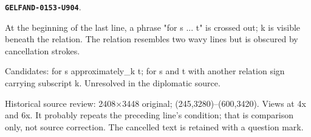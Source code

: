 \documentclass[11pt]{article}
\theoremstyle{definition}
\theoremstyle{remark}
\begin{document}
\par\noindent\leavevmode{}\label{GELFAND-0153-U904}\label{GELFAND-P001414:eq14-cancelled-condition:note}\textbf{\texttt{GELFAND-0153-U904}}.\nopagebreak[4]\par
At the beginning of the last line, a phrase "for s ... t" is crossed out; k is visible beneath the relation. The relation resembles two wavy lines but is obscured by cancellation strokes.\par
Candidates: for s approximately\_k t; for s and t with another relation sign carrying subscript k. Unresolved in the diplomatic source.\par
Historical source review: 2408×3448 original; (245,3280)–(600,3420). Views at 4x and 6x. It probably repeats the preceding line's condition; that is comparison only, not source correction. The cancelled text is retained with a question mark.\par\medskip
\end{document}
